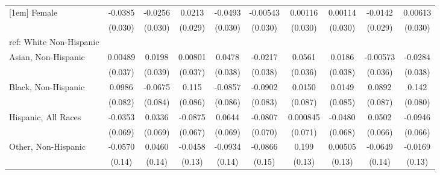 \begin{table}[htbp]
\begin{tabular}{l*{9}{c}}
[1em]
Female&     -0.0385         &     -0.0256         &      0.0213         &     -0.0493\sym{*}  &    -0.00543         &     0.00116         &     0.00114         &     -0.0142         &     0.00613         \\
  &     (0.030)         &     (0.030)         &     (0.029)         &     (0.030)         &     (0.030)         &     (0.030)         &     (0.030)         &     (0.029)         &     (0.030)         \\
[1em]
ref: White Non-Hispanic&                     &                     &                     &                     &                     &                     &                     &                     &                     \\
[1em]
Asian, Non-Hispanic&     0.00489         &      0.0198         &     0.00801         &      0.0478         &     -0.0217         &      0.0561         &      0.0186         &    -0.00573         &     -0.0284         \\
  &     (0.037)         &     (0.039)         &     (0.037)         &     (0.038)         &     (0.038)         &     (0.036)         &     (0.038)         &     (0.036)         &     (0.038)         \\
[1em]
Black, Non-Hispanic&      0.0986         &     -0.0675         &       0.115         &     -0.0857         &     -0.0902         &      0.0150         &      0.0149         &      0.0892         &       0.142\sym{*}  \\
  &     (0.082)         &     (0.084)         &     (0.086)         &     (0.086)         &     (0.083)         &     (0.087)         &     (0.085)         &     (0.087)         &     (0.080)         \\
[1em]
Hispanic, All Races&     -0.0353         &      0.0336         &     -0.0875         &      0.0644         &     -0.0807         &    0.000845         &     -0.0480         &      0.0502         &     -0.0946         \\
  &     (0.069)         &     (0.069)         &     (0.067)         &     (0.069)         &     (0.070)         &     (0.071)         &     (0.068)         &     (0.066)         &     (0.066)         \\
[1em]
Other, Non-Hispanic&     -0.0570         &      0.0460         &     -0.0458         &     -0.0934         &     -0.0866         &       0.199         &     0.00505         &     -0.0649         &     -0.0169         \\
  &      (0.14)         &      (0.14)         &      (0.13)         &      (0.14)         &      (0.15)         &      (0.13)         &      (0.13)         &      (0.14)         &      (0.13)         \\

\end{tabular}
\end{table}
